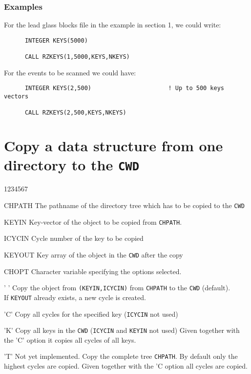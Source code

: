 \subsubsection*{Examples}

For the lead glass blocks file in the example in
section 1, we could write:
\begin{verbatim}
      INTEGER KEYS(5000)
 
      CALL RZKEYS(1,5000,KEYS,NKEYS)
\end{verbatim}
For the events to be scanned we could have:
\begin{verbatim}
      INTEGER KEYS(2,500)                      ! Up to 500 keys vectors
 
      CALL RZKEYS(2,500,KEYS,NKEYS)
\end{verbatim}

\section{Copy a data structure from one directory to the \texttt{CWD}}

\begin{DLtt}{1234567}
\item[CHPATH]The pathname of the directory tree which has to be copied
to the {\tt CWD}
\item[KEYIN]Key-vector of the object to be copied from {\tt CHPATH}.
\item[ICYCIN]Cycle number of the key to be copied
\item[KEYOUT]Key array of the object in the {\tt CWD} after the copy
\item[CHOPT]Character variable specifying the options selected.
\begin{DLtt}{12}
\item[' ']Copy the object from {\tt (KEYIN,ICYCIN)} from
{\tt CHPATH} to the {\tt CWD} (default).\\
If {\tt KEYOUT} already exists, a new cycle is created.
\item['C']Copy all cycles for the specified key ({\tt ICYCIN} not used)
\item['K']Copy all keys in the {\tt CWD} ({\tt ICYCIN} and {\tt KEYIN} not used)
Given together with the 'C' option it copies all cycles of all keys.
\item['T']Not yet implemented. Copy the complete tree {\tt CHPATH}.
By default only the highest cycles are copied.
Given together with the 'C option all cycles are copied.
\end{DLtt}
\end{DLtt}

